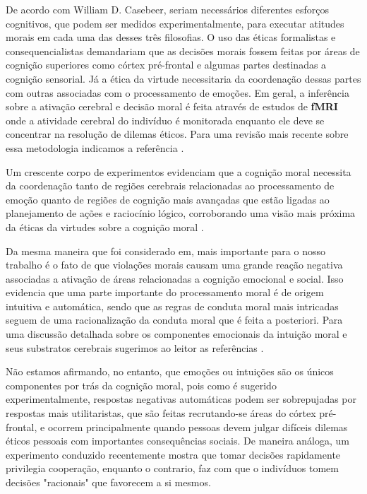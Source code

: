 De acordo com William D. Casebeer\citep{Casebeer2003}, seriam necessários
diferentes esforços cognitivos, que podem ser medidos experimentalmente,
para executar atitudes morais em cada uma das desses três filosofias. O uso
das éticas formalistas e consequencialistas demandariam que as decisões
morais fossem feitas por áreas de cognição superiores como córtex pré-frontal
e algumas partes destinadas a cognição sensorial. Já a ética da virtude
necessitaria da coordenação dessas partes com outras associadas com o
processamento de emoções. Em geral, a inferência sobre a ativação cerebral e
decisão moral é feita através de estudos de \textbf{fMRI} onde a atividade
cerebral do indivíduo é monitorada enquanto ele deve se concentrar na resolução
de dilemas éticos. Para uma revisão mais recente sobre essa metodologia
indicamos a referência . 

Um crescente corpo de experimentos \citep{Greene2004,Christensen2012}
evidenciam que a cognição moral necessita da coordenação tanto de regiões
cerebrais relacionadas ao processamento de emoção quanto de regiões de
cognição mais avançadas que estão ligadas ao planejamento de ações
e raciocínio lógico, corroborando uma visão mais próxima da éticas da
virtudes sobre a cognição moral \citep{Casebeer2003}.

Da mesma maneira que foi considerado em\citep{Caticha2011a}, mais importante
para o nosso trabalho é o fato de que violações morais causam uma
grande reação negativa associadas a ativação de áreas
relacionadas a cognição emocional e social. Isso evidencia
que uma parte importante do processamento moral é de origem intuitiva e
automática\cite{Haidt2001,Greene2002,}, sendo que as regras de conduta
moral mais intricadas seguem de uma racionalização da conduta moral que
é feita a posteriori. Para uma discussão detalhada sobre os componentes
emocionais da intuição moral e seus substratos cerebrais sugerimos ao
leitor as referências \citep{Greene2001,Moll2005,Woodward2008}.

Não estamos afirmando, no entanto, que emoções ou intuições são os
únicos componentes por trás da cognição moral, pois como é sugerido
experimentalmente, respostas negativas automáticas podem ser sobrepujadas
por respostas mais utilitaristas, que são feitas recrutando-se áreas
do córtex pré-frontal, e ocorrem principalmente quando pessoas devem
julgar difíceis dilemas éticos pessoais com importantes consequências
sociais\cite{Pizarro2003,Koenigs2007}.  De maneira análoga, um experimento
conduzido recentemente \cite{Rand2012} mostra que tomar decisões rapidamente
privilegia cooperação, enquanto o contrario, faz com que o indivíduos
tomem  decisões "racionais" que favorecem a si mesmos.

